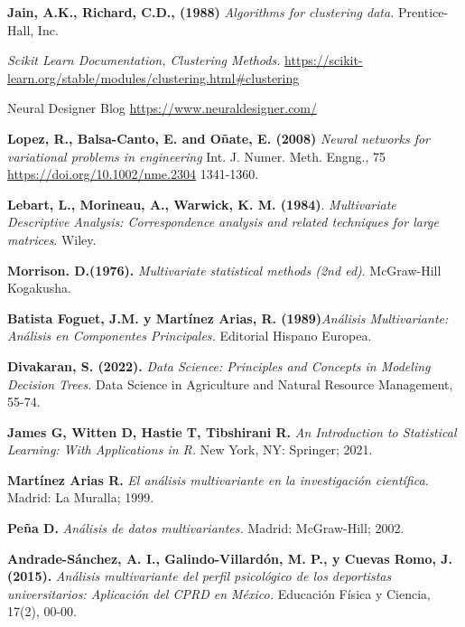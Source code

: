 \begin{thebibliography}{99}
 \textbf{Jain, A.K., Richard, C.D., (1988)} \textit{Algorithms for clustering data.} Prentice-Hall, Inc. 

 \textit{Scikit Learn Documentation, Clustering Methods. } \url{https://scikit-learn.org/stable/modules/clustering.html#clustering}


 Neural Designer Blog \url{https://www.neuraldesigner.com/}
          
 \textbf{Lopez, R., Balsa-Canto, E. and Oñate, E. (2008)} \textit{ Neural networks for variational problems in engineering} Int. J. Numer. Meth. Engng., 75\\ \url{https://doi.org/10.1002/nme.2304} 1341-1360. 


\textbf{Lebart, L., Morineau, A.,  Warwick, K. M. (1984)}.\textit{ Multivariate Descriptive Analysis: Correspondence analysis and related techniques for large matrices}. Wiley.

\textbf{Morrison. D.(1976).}\textit{ Multivariate statistical methods (2nd ed)}. McGraw-Hill Kogakusha.

\textbf{Batista Foguet, J.M. y Martínez Arias, R. (1989)}\textit{Análisis Multivariante: Análisis en Componentes Principales. } Editorial Hispano Europea.

\textbf{Divakaran, S. (2022). }\textit{Data Science: Principles and Concepts in Modeling Decision Trees.} Data Science in Agriculture and Natural Resource Management, 55-74.

\textbf{James G, Witten D, Hastie T, Tibshirani R.} \emph{An Introduction to Statistical Learning: With Applications in R.} New York, NY: Springer; 2021. 
  


\textbf{Martínez Arias R.} \emph{El análisis multivariante en la investigación científica.} Madrid: La Muralla; 1999. 
  


\textbf{Peña D.} \emph{Análisis de datos multivariantes.} Madrid: McGraw-Hill; 2002.

\textbf{Andrade-Sánchez, A. I., Galindo-Villardón, M. P., y Cuevas Romo, J. (2015).} \textit{Análisis multivariante del perfil psicológico de los deportistas universitarios: Aplicación del CPRD en México.} Educación Física y Ciencia, 17(2), 00-00.


\end{thebibliography}
